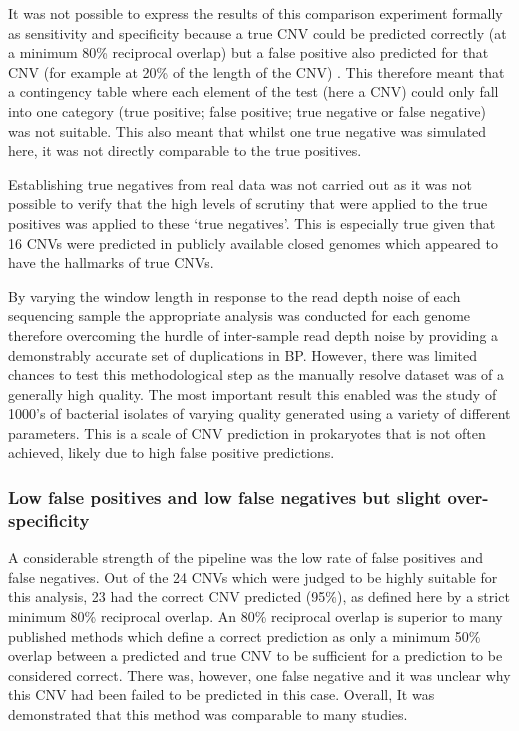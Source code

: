 \documentclass{article}
\begin{document}

It was not possible to express the results of this comparison experiment formally as sensitivity and specificity because a true CNV could be predicted correctly (at a minimum 80\% reciprocal overlap) but a false positive also predicted for that CNV (for example at 20\% of the length of the CNV) . This therefore meant that a contingency table where each element of the test (here a CNV) could only fall into one category (true positive; false positive; true negative or false negative) was not suitable. This also meant that whilst one true negative was simulated here, it was not directly comparable to the true positives. 

Establishing true negatives from real data was not carried out as it was not possible to verify that the high levels of scrutiny that were applied to the true positives was applied to these `true negatives'. This is especially true given that 16 CNVs were predicted in publicly available closed genomes which  appeared to have the hallmarks of true CNVs. 

By varying the window length in response to the read depth noise of each sequencing sample the appropriate analysis was conducted for each genome therefore overcoming the hurdle of inter-sample read depth noise by providing a demonstrably accurate set of duplications in BP. However, there was limited chances to test this methodological step as the manually resolve dataset was of a generally high quality. The most important result this enabled was the study of 1000's of bacterial isolates of varying quality generated using a variety of different parameters. This is a scale of CNV prediction in prokaryotes that is not often achieved, likely due to high false positive predictions. 


\subsubsection{Low false positives and low false negatives but slight over-specificity}

A considerable strength of the pipeline was the low rate of false positives and false negatives. Out of the 24 CNVs which were judged to be highly suitable for this analysis, 23 had the correct CNV predicted (95\%), as defined here by a strict minimum 80\% reciprocal overlap.  An 80\% reciprocal overlap is superior to many published methods which define a correct prediction as only a minimum 50\% overlap between a predicted and true CNV to be sufficient for a prediction to be considered correct. There was, however,  one false negative and it was unclear why this CNV had been failed to be predicted in this case.  Overall, It was demonstrated that this method was comparable to many studies.
\end{document}
